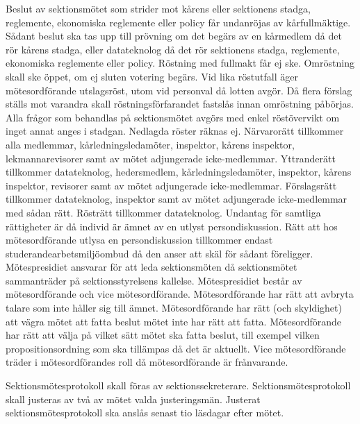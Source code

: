 \documentclass[a4paper]{dteklag}
\begin{document}
\para[Överklagande] Beslut av sektionsmötet som strider mot kårens eller sektionens stadga, reglemente, ekonomiska reglemente eller policy får undanröjas av kårfullmäktige.
\stycke Sådant beslut ska tas upp till prövning om det begärs av en kårmedlem då det rör kårens stadga, eller datateknolog då det rör sektionens stadga, reglemente, ekonomiska reglemente eller policy.
\para[Omröstning] Röstning med fullmakt får ej ske.
\para Omröstning skall ske öppet, om ej sluten votering begärs.
\para Vid lika röstutfall äger mötesordförande utslagsröst, utom vid personval då lotten avgör.
\para Då flera förslag ställs mot varandra skall röstningsförfarandet fastslås innan omröstning påbörjas.
\para Alla frågor som behandlas på sektionsmötet avgörs med enkel röstövervikt om inget annat anges i stadgan. Nedlagda röster räknas ej.
\para[Rättigheter] Närvarorätt tillkommer alla medlemmar, kårledningsledamöter, inspektor, kårens inspektor, lekmannarevisorer samt av mötet adjungerade icke-medlemmar.
\para Yttranderätt tillkommer datateknolog, hedersmedlem, kårledningsledamöter, inspektor, kårens inspektor, revisorer samt av mötet adjungerade icke-medlemmar.
\para Förslagsrätt tillkommer datateknolog, inspektor samt av mötet adjungerade icke-medlemmar med sådan rätt.
\para Rösträtt tillkommer datateknolog.
\para[Persondiskussion] Undantag för samtliga rättigheter är då individ är ämnet av en utlyst persondiskussion.
\para Rätt att hos mötesordförande utlysa en persondiskussion tillkommer endast studerandearbetsmiljöombud då den anser att skäl för sådant föreligger.
\para[Mötespresidium] Mötespresidiet ansvarar för att leda sektionsmöten då sektionsmötet sammanträder på sektionsstyrelsens kallelse.
\para Mötespresidiet består av mötesordförande och vice mötesordförande.
\para Mötesordförande har rätt att avbryta talare som inte håller sig till ämnet.
\para Mötesordförande har rätt (och skyldighet) att vägra mötet att fatta beslut mötet inte har rätt att fatta.
\para Mötesordförande har rätt att välja på vilket sätt mötet ska fatta beslut, till exempel vilken propositionsordning som ska tillämpas då det är aktuellt.
\para Vice mötesordförande träder i mötesordförandes roll då mötesordförande är frånvarande.

\para[Protokoll] Sektionsmötesprotokoll skall föras av sektionssekreterare.
\para Sektionsmötesprotokoll skall justeras av två av mötet valda justeringsmän.
\para Justerat sektionsmötesprotokoll ska anslås senast tio läsdagar efter mötet.

\end{document}
